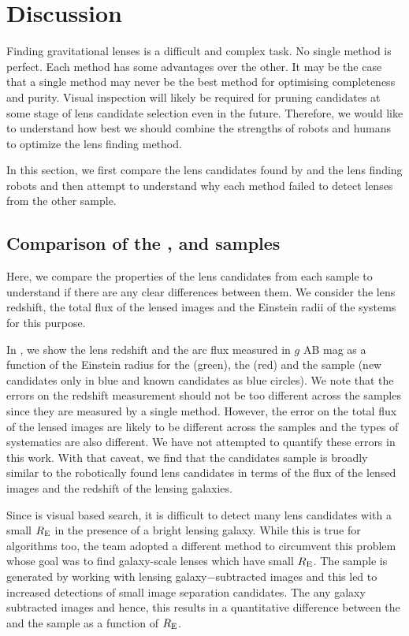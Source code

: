 \documentclass[useAMS,usenatbib,a4paper]{mn2e}
\begin{document}
\section{Discussion}
\label{sec:discuss}

Finding gravitational lenses is a difficult and complex task. No single
method is perfect. Each method has some advantages over the other. It
may be the case that a single method may never be the best method for
optimising completeness and purity. Visual inspection will likely be
required for pruning candidates at some stage of lens candidate
selection even in the future. Therefore, we would like to understand how
best we should combine the strengths of robots and humans to optimize
the lens finding method.

In this section, we first compare the lens candidates found by
\sw and the lens finding robots and then attempt to understand why each
method failed to detect lenses from the other sample.

\subsection{Comparison of the \rf, \sw and \af samples}
Here, we compare the properties of the lens candidates from each sample
to understand if there are any clear differences between them. We
consider the lens redshift, the total flux of the lensed images and the
Einstein radii of the systems for this purpose.

In , we show the lens redshift and the arc flux
measured in $g$ AB mag as a function of the Einstein radius for the \rf
(green), the \af (red) and the \sw sample (new candidates only in blue
and known candidates as blue circles). We note that the errors on the
redshift measurement should not be too different across the samples
since they are measured by a single method. However, the error on the
total flux of the lensed images are likely to be different across the
samples and the types of systematics are also different.  We have not
attempted to quantify these errors in this work. With that caveat, we
find that the \sw candidates sample is broadly similar to the
robotically found lens candidates in terms of the flux of the lensed
images and the redshift of the lensing galaxies.

Since \sw is visual based search, it is difficult to detect many lens
candidates with a small $R_{\rm E}$ in the presence of a bright lensing
galaxy. While this is true for algorithms too, the \rf team adopted a
different method to circumvent this problem whose goal was to find
galaxy-scale lenses which have small $R_{\rm E}$. The \rf sample is
generated by working with lensing galaxy$-$subtracted images and this
led to increased detections of small image separation candidates. The
 any galaxy subtracted images and hence,
this results in a quantitative difference between the \sw and the \rf
sample as a function of $R_{\rm E}$.
\end{document}
